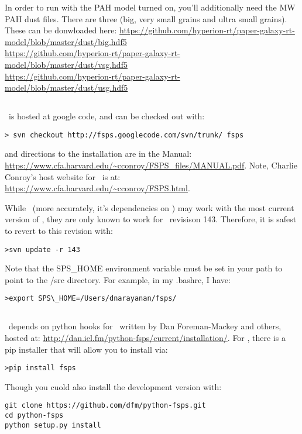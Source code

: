 In order to run with the PAH model turned on, you'll additionally need the MW PAH dust files.  There are three (big, very small grains and ultra small grains).  These can be donwloaded here:
\url{https://github.com/hyperion-rt/paper-galaxy-rt-model/blob/master/dust/big.hdf5}\\
\url{https://github.com/hyperion-rt/paper-galaxy-rt-model/blob/master/dust/vsg.hdf5}\\
\url{https://github.com/hyperion-rt/paper-galaxy-rt-model/blob/master/dust/usg.hdf5}\\

\subsection{\fsps}
\fsps \ is hosted at google code, and can be checked out with:
\begin{verbatim}
> svn checkout http://fsps.googlecode.com/svn/trunk/ fsps
\end{verbatim}
and directions to the installation are in the Manual:
\url{https://www.cfa.harvard.edu/~cconroy/FSPS_files/MANUAL.pdf}.
Note, Charlie Conroy's host website for \fsps \ is at:
\url{https://www.cfa.harvard.edu/~cconroy/FSPS.html}.

While \pd \ (more accurately, it's dependencies on \pfsps) may
work with the most current version of \fsps, they are only known to
work for \fsps \ revisison 143.  Therefore, it is safest to revert to
this revision with:
\begin{verbatim}
>svn update -r 143
\end{verbatim}
Note that the SPS\_HOME environment variable must be set in your path
to point to the \fsps/src directory.  For example, in my .bashrc, I have:
\begin{verbatim}
>export SPS\_HOME=/Users/dnarayanan/fsps/
\end{verbatim}
\subsection{\pfsps}
\pd \ depends on python hooks for \fsps \ written by Dan
Foreman-Mackey and others, hosted at:
\url{http://dan.iel.fm/python-fsps/current/installation/}.  
For \pfsps, there is a pip installer that will allow you to install via:
\begin{verbatim}
>pip install fsps
\end{verbatim}
Though you cuold also install the development version with:
\begin{verbatim}
git clone https://github.com/dfm/python-fsps.git
cd python-fsps
python setup.py install
\end{verbatim}

